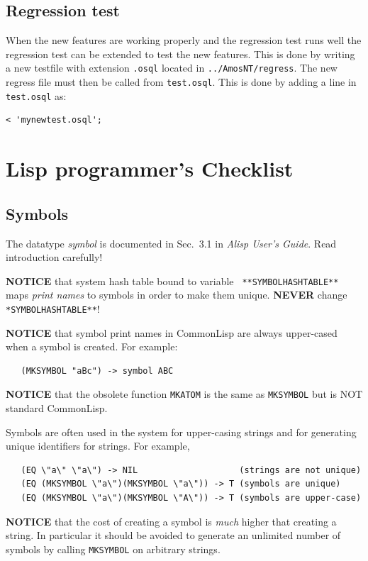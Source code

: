 \subsection{Regression test}
When the new features are working properly and the regression test runs well
the regression test can be extended to test the new features. This is done
by writing a new testfile with extension {\tt .osql} located in 
{\tt ../AmosNT/regress}. The new regress file must then be called from 
{\tt test.osql}. This is done by adding a line in {\tt test.osql} as:
\begin{verbatim}
< 'mynewtest.osql';
\end{verbatim}

\newpage
\section{Lisp programmer's Checklist}
\subsection{Symbols}
The datatype {\em symbol} is documented in Sec.~3.1 in {\em Alisp
User's Guide}. Read introduction carefully!

{\bf NOTICE} that system hash table bound to variable {\tt
**SYMBOLHASHTABLE**} maps {\em print names} to symbols in order to
make them unique. {\bf NEVER} change {\tt **SYMBOLHASHTABLE**}!

{\bf NOTICE} that symbol print names in CommonLisp are always
upper-cased when a symbol is created. For example:
\begin{verbatim}
   (MKSYMBOL "aBc") -> symbol ABC
\end{verbatim}
{\bf NOTICE} that the obsolete function {\tt MKATOM} is the same as
{\tt MKSYMBOL} but is NOT standard CommonLisp.

Symbols are often used in the system for upper-casing strings and for
generating unique identifiers for strings. For example,
\begin{verbatim}
   (EQ \"a\" \"a\") -> NIL                    (strings are not unique)
   (EQ (MKSYMBOL \"a\")(MKSYMBOL \"a\")) -> T (symbols are unique)
   (EQ (MKSYMBOL \"a\")(MKSYMBOL \"A\")) -> T (symbols are upper-case)
\end{verbatim}

{\bf NOTICE} that the cost of creating a symbol is {\em much} higher
that creating a string. In particular it should be avoided to generate
an unlimited number of symbols by calling {\tt MKSYMBOL} on arbitrary
strings.

